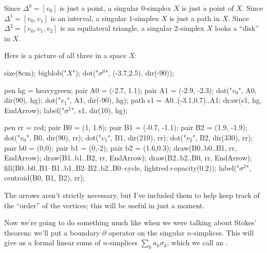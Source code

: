\begin{example}
	\listhack
	\label{ex:simplex}
	\begin{enumerate}[(a)]
		\ii Since $\Delta^0 = [v_0]$ is just a point,
		a singular $0$-simplex $X$ is just a point of $X$.
		\ii Since $\Delta^1 = [v_0, v_1]$ is an interval,
		a singular $1$-simplex $X$ is just a path in $X$.
		\ii Since $\Delta^2 = [v_0, v_1, v_2]$ is an equilateral triangle,
		a singular $2$-simplex $X$ looks a ``disk'' in $X$.
	\end{enumerate}
	Here is a picture of all three in a space $X$:
	\begin{center}
		\begin{asy}
			size(8cm);
			bigblob("$X$");
			dot("$\sigma^0$", (-3.7,2.5), dir(-90));

			pen hg = heavygreen;
			pair A0 = (-2.7, 1.1);
			pair A1 = (-2.9, -2.3);
			dot("$v_0$", A0, dir(90), hg);
			dot("$v_1$", A1, dir(-90), hg);
			path s1 = A0..(-3.1,0.7)..A1;
			draw(s1, hg, EndArrow);
			label("$\sigma^1$", s1, dir(10), hg);

			pen rr = red;
			pair B0 = (1, 1.8);
			pair B1 = (-0.7, -1.1);
			pair B2 = (1.9, -1.9);
			dot("$v_0$", B0, dir(90), rr);
			dot("$v_1$", B1, dir(210), rr);
			dot("$v_2$", B2, dir(330), rr);
			pair b0 = (0,0);
			pair b1 = (0,-2);
			pair b2 = (1.6,0.3);
			draw(B0..b0..B1, rr, EndArrow);
			draw(B1..b1..B2, rr, EndArrow);
			draw(B2..b2..B0, rr, EndArrow);
			fill(B0..b0..B1--B1..b1..B2--B2..b2..B0--cycle, lightred+opacity(0.2));
			label("$\sigma^2$", centroid(B0, B1, B2), rr);
		\end{asy}
	\end{center}
	The arrows aren't strictly necessary, but I've included them
	to help keep track of the ``order'' of the vertices;
	this will be useful in just a moment.
\end{example}

Now we're going to do something much like
when we were talking about Stokes' theorem:
we'll put a boundary $\partial$ operator on the singular $n$-simplices.
This will give us a formal linear sums of $n$-simplices $\sum_k a_k \sigma_k$,
which we call an .

